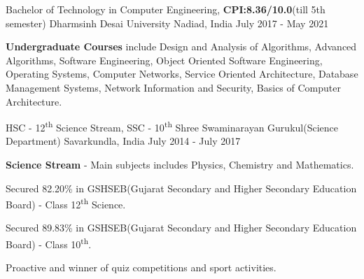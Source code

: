 
\begin{cventries}
  \cventry
    {Bachelor of Technology in Computer Engineering, \textbf{CPI:8.36/10.0}(till 5th semester)} %
    {Dharmsinh Desai University} %
    {Nadiad, India} %
    {July 2017 - May 2021} %
    {
      \begin{cvitems} %
         \item {\textbf{Undergraduate Courses} include Design and Analysis of Algorithms, Advanced Algorithms, Software Engineering, Object Oriented
Software Engineering, Operating Systems, Computer Networks, Service Oriented Architecture, Database Management Systems,
Network Information and Security, Basics of Computer Architecture.}
         \vspace{0.5mm}
      \end{cvitems}
    }
    
\end{cventries}
\begin{cventries}
  \cventry
    {HSC - 12\textsuperscript{th} Science Stream, SSC - 10\textsuperscript{th}} %
    {Shree Swaminarayan Gurukul(Science Department)} %
    {Savarkundla, India} %
    {July 2014 - July 2017} %
    {
      \begin{cvitems} %
         \item {\textbf{Science Stream} -  Main subjects includes Physics, Chemistry and Mathematics.}
         \vspace{0.5mm}
          \item {Secured 82.20\% in GSHSEB(Gujarat Secondary and Higher Secondary Education Board) - Class 12\textsuperscript{th} Science.}
          \vspace{0.5mm}
          \item {Secured 89.83\% in GSHSEB(Gujarat Secondary and Higher Secondary Education Board) - Class 10\textsuperscript{th}.}
          \vspace{0.5mm}
          \item {Proactive and winner of quiz competitions and sport activities.}
          \vspace{0.5mm}
      \end{cvitems}
    }
    
\end{cventries}

